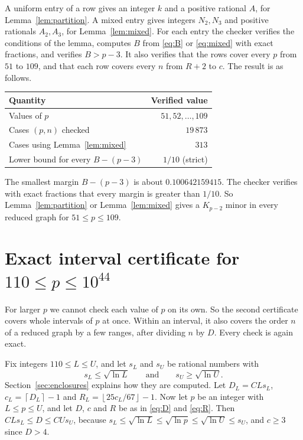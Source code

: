 \documentclass[11pt]{article}
\newcommand{\floor}[1]{\left\lfloor#1\right\rfloor}
\newcommand{\ceil}[1]{\left\lceil#1\right\rceil}
\begin{document}
A uniform entry of a row gives an integer $k$ and a positive rational $A$,
for Lemma~\ref{lem:partition}. A mixed entry gives integers $N_2,N_3$ and
positive rationals $A_2,A_3$, for Lemma~\ref{lem:mixed}. For each entry the
checker verifies the conditions of the lemma, computes $B$ from
\eqref{eq:B} or \eqref{eq:mixed} with exact fractions, and verifies
$B>p-3$. It also verifies that the rows cover every $p$ from $51$ to $109$,
and that each row covers every $n$ from $R+2$ to $c$. The result is as
follows.
\begin{center}
\begin{tabular}{lr}
\toprule
Quantity & Verified value\\
\midrule
Values of $p$ & $51,52,\ldots,109$\\
Cases $(p,n)$ checked & $19\,873$\\
Cases using Lemma~\ref{lem:mixed} & $313$\\
Lower bound for every $B-(p-3)$ & $1/10$ (strict)\\
\bottomrule
\end{tabular}
\end{center}
The smallest margin $B-(p-3)$ is about $0.100642159415$. The checker verifies
with exact fractions that every margin is greater than $1/10$. So
Lemma~\ref{lem:partition} or Lemma~\ref{lem:mixed} gives a $K_{p-2}$ minor
in every reduced graph for $51\le p\le109$.

\section{Exact interval certificate for \texorpdfstring{$110\le p\le10^{44}$}{110 <= p <= 10\^{}44}}
\label{sec:medium}

For larger $p$ we cannot check each value of $p$ on its own. So the second
certificate covers whole intervals of $p$ at once. Within an interval, it
also covers the order $n$ of a reduced graph by a few ranges, after dividing
$n$ by $D$. Every check is again exact.

Fix integers $110\le L\le U$, and let $s_L$ and $s_U$ be rational numbers
with
\begin{equation*}
 s_L\le\sqrt{\ln L}\qquad\text{and}\qquad s_U\ge\sqrt{\ln U}.
\end{equation*}
Section~\ref{sec:enclosures} explains how they are computed. Let
$D_L=CLs_L$, $c_L=\ceil{D_L}-1$ and $R_L=\floor{25c_L/67}-1$. Now let $p$ be
an integer with $L\le p\le U$, and let $D$, $c$ and $R$ be as in \eqref{eq:D}
and \eqref{eq:R}. Then $CLs_L\le D\le CUs_U$, because
$s_L\le\sqrt{\ln L}\le\sqrt{\ln p}\le\sqrt{\ln U}\le s_U$, and $c\ge3$ since
$D>4$.
\end{document}
